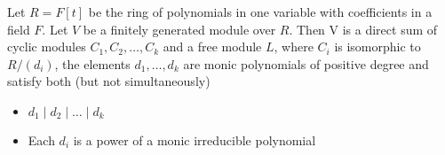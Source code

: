 \documentclass{memoir}
\begin{document}
\begin{thm}
	Let \(R = F[t]\) be the ring of polynomials in one variable with coefficients in a field \(F\). Let \(V\) be a finitely generated module over \(R\). Then V is a direct sum of cyclic modules \(C_1,C_2,\ldots,C_k\) and a free module \(L\), where \(C_i\) is isomorphic to \(R / (d_i)\), the elements \(d_1,\ldots,d_k\) are monic polynomials of positive degree and satisfy both (but not simultaneously)
\begin{itemize}
	\item \(d_1\mid d_2\mid \ldots\mid d_k\) 
	\item Each \(d_i\) is a power of a monic irreducible polynomial
\end{itemize}
\end{thm}
\end{document}
